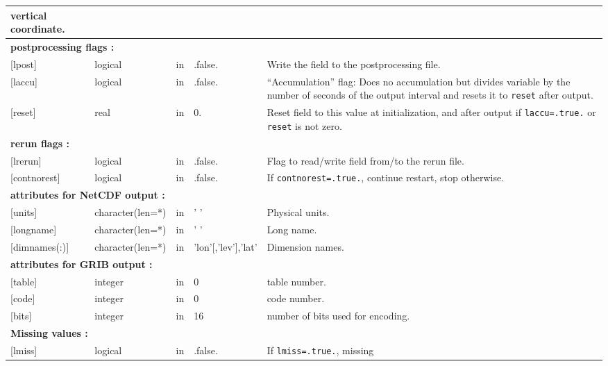 {\begin{tabular}{|llllp{6cm}|}
                                             vertical coordinate.\\
\hline
\multicolumn{5}{|l|}{\bf postprocessing flags :}\\
{[lpost]}      &logical &in&.false.& Write the field to the
                                     postprocessing file.\\
{[laccu]}      &logical &in&.false.& ``Accumulation'' flag: Does no
accumulation but divides variable by the number of seconds of the
output interval and resets it to {\tt reset} after output.\\
{[reset]}      &real    &in&0.     & Reset field to this value at initialization,
and after output if {\tt laccu=.true.} or {\tt reset} is not zero.\\
\hline
\multicolumn{5}{|l|}{\bf rerun flags :}\\
{[lrerun]}     &logical &in&.false.& Flag to read/write field from/to
                                     the rerun file.\\
{[contnorest]} &logical &in&.false.& If {\tt contnorest=.true.},
continue restart, stop otherwise.\\
\hline
\multicolumn{5}{|l|}{\bf attributes for NetCDF output :}\\
{[units]}      &character(len=*)&in&' '                & Physical units.\\
{[longname]}   &character(len=*)&in&' '                & Long name.\\
{[dimnames(:)]}&character(len=*)&in&'lon'[,'lev'],'lat'& Dimension names.\\ 
\hline
\multicolumn{5}{|l|}{\bf attributes for GRIB output :}\\
{[table]}      &integer     &in& 0  & table number.\\
{[code]}       &integer     &in& 0  & code number.\\
{[bits]}       &integer     &in& 16 & number of bits used for encoding.\\
\hline
\multicolumn{5}{|l|}{\bf Missing values :} \\
{[lmiss]}      &logical     &in&.false.&If {\tt lmiss=.true.}, missing

\end{tabular}}
